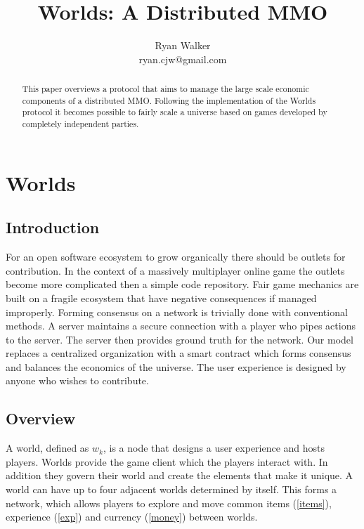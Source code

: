 \documentclass[runningheads,a4paper]{llncs}
\begin{document}
\def \SystemName {Worlds} %

\mainmatter  %

\title{\SystemName: A Distributed MMO}

\author{Ryan Walker\\
				ryan.cjw@gmail.com}

\institute{} %

\maketitle

\begin{abstract}
This paper overviews a protocol that aims to manage the large scale economic components of a distributed MMO. Following the implementation of the Worlds protocol it becomes possible to fairly scale a universe based on games developed by completely independent parties. 
\end{abstract}

\section{Worlds}
\subsection{Introduction}
For an open software ecosystem to grow organically there should be outlets for contribution. In the context of a massively multiplayer online game the outlets become more complicated then a simple code repository. Fair game mechanics are built on a fragile ecosystem that have negative consequences if managed improperly. Forming consensus on a network is trivially done with conventional methods. A server maintains a secure connection with a player who pipes actions to the server. The server then provides ground truth for the network. Our model replaces a centralized organization with a smart contract which forms consensus and balances the economics of the universe. The user experience is designed by anyone who wishes to contribute.

\subsection{Overview}
A world, defined as $w_k$, is a node that designs a user experience and hosts players. Worlds provide the game client which the players interact with. In addition they govern their world and create the elements that make it unique. A world can have up to four adjacent worlds determined by itself. This forms a network, which allows players to explore and move common items (\ref{items}), experience (\ref{exp}) and currency (\ref{money}) between worlds.
\end{document}
